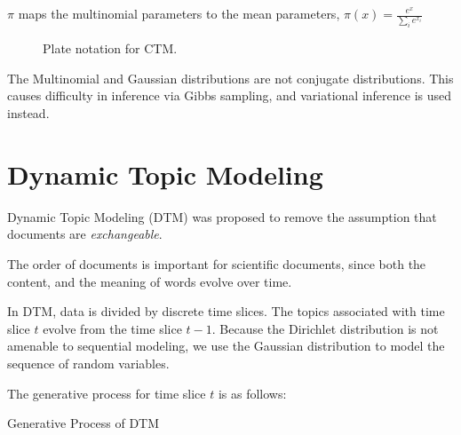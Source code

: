 \documentclass[letterpaper]{article}
\begin{document}
$\pi$ maps the multinomial parameters to the mean parameters,
$\pi\left( x \right) = \frac{e^x}{\sum_{i} e^{x_i}}$

\begin{figure}[ht]
  \centering
  \caption{\label{fig:ctm_plate} Plate notation for CTM.}
\end{figure}


The Multinomial and Gaussian distributions are not conjugate
distributions. This causes difficulty in inference via Gibbs sampling,
and variational inference is used instead.

\section{Dynamic Topic Modeling}
\label{sec:dtm}
Dynamic Topic Modeling (DTM) was proposed to remove the assumption
that documents are \textit{exchangeable}. \cite{blei2006dynamic}

The order of documents is important for scientific documents, since
both the content, and the meaning of words evolve over time.

In DTM, data is divided by discrete time slices. The topics associated
with time slice $t$ evolve from the time slice $t-1$. Because the
Dirichlet distribution is not amenable to sequential modeling, we use
the Gaussian distribution to model the sequence of random variables.

The generative process for time slice $t$ is as follows:

\begin{algorithm}
  \caption{Generative Process of DTM}\label{alg:DTM}
  \begin{algorithmic}[1]
    \EndFor
    \EndFor
  \end{algorithmic}
\end{algorithm}
\end{document}
